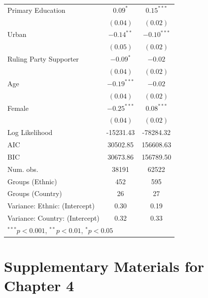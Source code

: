 \documentclass[12pt,]{book}
\let\origtable\table
\let\endorigtable\endtable
\renewenvironment{table}[1][2] {
    \singlespacing
    \expandafter\origtable\expandafter[H]
} {
    \endorigtable
}
\theoremstyle{definition}
\theoremstyle{definition}
\theoremstyle{definition}
\theoremstyle{remark}
\begin{document}
\begin{table}
\begin{center}
\begin{tabular}{l c c }
Primary Education                       & $0.09^{*}$    & $0.15^{***}$  \\
                                        & $(0.04)$      & $(0.02)$      \\
Urban                                   & $-0.14^{**}$  & $-0.10^{***}$ \\
                                        & $(0.05)$      & $(0.02)$      \\
Ruling Party Supporter                  & $-0.09^{*}$   & $-0.02$       \\
                                        & $(0.04)$      & $(0.02)$      \\
Age                                     & $-0.19^{***}$ & $-0.02$       \\
                                        & $(0.04)$      & $(0.02)$      \\
Female                                  & $-0.25^{***}$ & $0.08^{***}$  \\
                                        & $(0.04)$      & $(0.02)$      \\
\hline
Log Likelihood                          & -15231.43     & -78284.32     \\
AIC                                     & 30502.85      & 156608.63     \\
BIC                                     & 30673.86      & 156789.50     \\
Num. obs.                               & 38191         & 62522         \\
Groups (Ethnic)                         & 452           & 595           \\
Groups (Country)                        & 26            & 27            \\
Variance: Ethnic: (Intercept)           & 0.30          & 0.19          \\
Variance: Country: (Intercept)          & 0.32          & 0.33          \\
\hline
\multicolumn{3}{l}{\scriptsize{$^{***}p<0.001$, $^{**}p<0.01$, $^*p<0.05$}}
\end{tabular}
\caption{Multilevel Ordinal Models of Attitudes Toward Violence and Ethnic Identity}
\label{tab:ordinal}
\end{center}
\end{table}

\hypertarget{supplementary-materials-for-chapter-4}{%
\section*{Supplementary Materials for Chapter
4}\label{supplementary-materials-for-chapter-4}}
\end{document}
